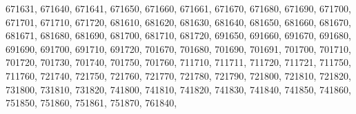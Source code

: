 \textquotesingle{}671631\textquotesingle{}, \textquotesingle{}671640\textquotesingle{}, \textquotesingle{}671641\textquotesingle{}, \textquotesingle{}671650\textquotesingle{}, \textquotesingle{}671660\textquotesingle{}, \textquotesingle{}671661\textquotesingle{}, \textquotesingle{}671670\textquotesingle{}, \textquotesingle{}671680\textquotesingle{}, \textquotesingle{}671690\textquotesingle{}, \textquotesingle{}671700\textquotesingle{}, \textquotesingle{}671701\textquotesingle{}, \textquotesingle{}671710\textquotesingle{}, \textquotesingle{}671720\textquotesingle{}, \textquotesingle{}681610\textquotesingle{}, \textquotesingle{}681620\textquotesingle{}, \textquotesingle{}681630\textquotesingle{}, \textquotesingle{}681640\textquotesingle{}, \textquotesingle{}681650\textquotesingle{}, \textquotesingle{}681660\textquotesingle{}, \textquotesingle{}681670\textquotesingle{}, \textquotesingle{}681671\textquotesingle{}, \textquotesingle{}681680\textquotesingle{}, \textquotesingle{}681690\textquotesingle{}, \textquotesingle{}681700\textquotesingle{}, \textquotesingle{}681710\textquotesingle{}, \textquotesingle{}681720\textquotesingle{}, \textquotesingle{}691650\textquotesingle{}, \textquotesingle{}691660\textquotesingle{}, \textquotesingle{}691670\textquotesingle{}, \textquotesingle{}691680\textquotesingle{}, \textquotesingle{}691690\textquotesingle{}, \textquotesingle{}691700\textquotesingle{}, \textquotesingle{}691710\textquotesingle{}, \textquotesingle{}691720\textquotesingle{}, \textquotesingle{}701670\textquotesingle{}, \textquotesingle{}701680\textquotesingle{}, \textquotesingle{}701690\textquotesingle{}, \textquotesingle{}701691\textquotesingle{}, \textquotesingle{}701700\textquotesingle{}, \textquotesingle{}701710\textquotesingle{}, \textquotesingle{}701720\textquotesingle{}, \textquotesingle{}701730\textquotesingle{}, \textquotesingle{}701740\textquotesingle{}, \textquotesingle{}701750\textquotesingle{}, \textquotesingle{}701760\textquotesingle{}, \textquotesingle{}711710\textquotesingle{}, \textquotesingle{}711711\textquotesingle{}, \textquotesingle{}711720\textquotesingle{}, \textquotesingle{}711721\textquotesingle{}, \textquotesingle{}711750\textquotesingle{}, \textquotesingle{}711760\textquotesingle{}, \textquotesingle{}721740\textquotesingle{}, \textquotesingle{}721750\textquotesingle{}, \textquotesingle{}721760\textquotesingle{}, \textquotesingle{}721770\textquotesingle{}, \textquotesingle{}721780\textquotesingle{}, \textquotesingle{}721790\textquotesingle{}, \textquotesingle{}721800\textquotesingle{}, \textquotesingle{}721810\textquotesingle{}, \textquotesingle{}721820\textquotesingle{}, \textquotesingle{}731800\textquotesingle{}, \textquotesingle{}731810\textquotesingle{}, \textquotesingle{}731820\textquotesingle{}, \textquotesingle{}741800\textquotesingle{}, \textquotesingle{}741810\textquotesingle{}, \textquotesingle{}741820\textquotesingle{}, \textquotesingle{}741830\textquotesingle{}, \textquotesingle{}741840\textquotesingle{}, \textquotesingle{}741850\textquotesingle{}, \textquotesingle{}741860\textquotesingle{}, \textquotesingle{}751850\textquotesingle{}, \textquotesingle{}751860\textquotesingle{}, \textquotesingle{}751861\textquotesingle{}, \textquotesingle{}751870\textquotesingle{}, \textquotesingle{}761840\textquotesingle{}, 